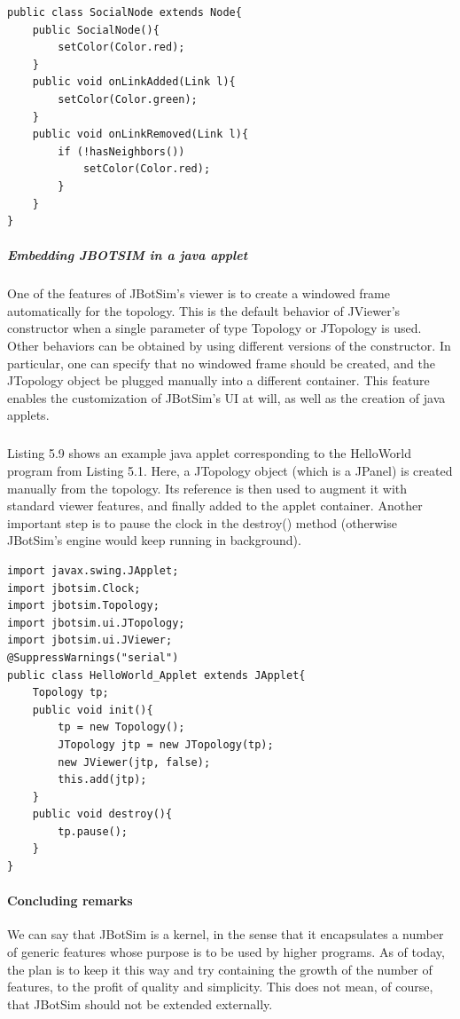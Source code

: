 \begin{lstlisting}[caption=Example of graph-based algorithm, captionpos=b]
public class SocialNode extends Node{
	public SocialNode(){
		setColor(Color.red);
	}
	public void onLinkAdded(Link l){
		setColor(Color.green);
	}
	public void onLinkRemoved(Link l){
		if (!hasNeighbors())
			setColor(Color.red);
		}
	}
}
\end{lstlisting}
\subparagraph{Embedding JBOTSIM in a java applet}One of the features of  JBotSim’s viewer is to create a windowed frame automatically for the topology. This is the default behavior of JViewer’s constructor when a single parameter of type Topology or JTopology is used. Other behaviors can be obtained by using different versions of the constructor. In particular, one can specify that no windowed frame should be created, and the JTopology object be plugged manually into a different container. This feature enables the customization of JBotSim’s UI at will, as well as the creation of java applets.
\subparagraph{}Listing 5.9 shows an example java applet corresponding to the HelloWorld program from Listing 5.1. Here, a JTopology object (which is a JPanel) is created manually from the topology. Its reference is then used to augment it with standard viewer features, and finally added to the applet container. Another important step is to pause the clock in the destroy() method (otherwise JBotSim’s engine would keep running in background).
\newpage
\begin{lstlisting}[caption=Embedding a JBotSim demo into a java applet, captionpos=b]
import javax.swing.JApplet;
import jbotsim.Clock;
import jbotsim.Topology;
import jbotsim.ui.JTopology;
import jbotsim.ui.JViewer;
@SuppressWarnings("serial")
public class HelloWorld_Applet extends JApplet{
	Topology tp;
	public void init(){
		tp = new Topology();
		JTopology jtp = new JTopology(tp);
		new JViewer(jtp, false);
		this.add(jtp);
	}
	public void destroy(){
		tp.pause();
	}
}
\end{lstlisting}

\paragraph{Concluding remarks}We can say that JBotSim is a kernel, in the sense that it encapsulates a number of generic features whose purpose is to be used by higher programs. As of today, the plan is to keep it this way and try containing the growth of the number of features, to the profit of quality and simplicity. This does not mean, of course, that JBotSim should not be extended externally.

